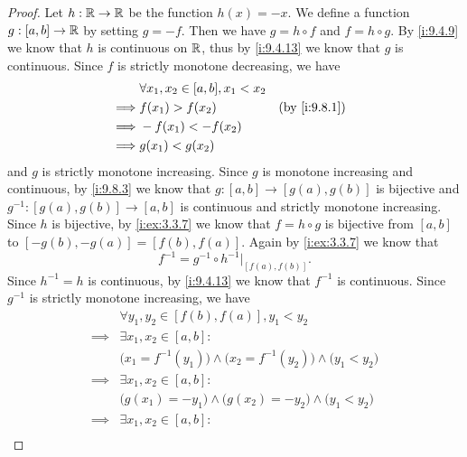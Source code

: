 \begin{proof}
  Let \(h : \mathbb{R} \to \mathbb{R}\) be the function \(h(x) = -x\).
  We define a function \(g : [a, b] \to \mathbb{R}\) by setting \(g = -f\).
  Then we have \(g = h \circ f\) and \(f = h \circ g\).
  By \cref{i:9.4.9} we know that \(h\) is continuous on \(\mathbb{R}\), thus by \cref{i:9.4.13} we know that \(g\) is continuous.
  Since \(f\) is strictly monotone decreasing, we have
  \begin{align*}
             & \forall x_1, x_2 \in [a, b], x_1 < x_2                   \\
    \implies & f(x_1) > f(x_2)                        &  & \by{i:9.8.1} \\
    \implies & -f(x_1) < -f(x_2)                                        \\
    \implies & g(x_1) < g(x_2)
  \end{align*}
  and \(g\) is strictly monotone increasing.
  Since \(g\) is monotone increasing and continuous, by \cref{i:9.8.3} we know that \(g : [a, b] \to [g(a), g(b)]\) is bijective and \(g^{-1} : [g(a), g(b)] \to [a, b]\) is continuous and strictly monotone increasing.
  Since \(h\) is bijective, by \cref{i:ex:3.3.7} we know that \(f = h \circ g\) is bijective from \([a, b]\) to \([-g(b), -g(a)] = [f(b), f(a)]\).
  Again by \cref{i:ex:3.3.7} we know that
  \[
    f^{-1} = g^{-1} \circ h^{-1}|_{[f(a), f(b)]}.
  \]
  Since \(h^{-1} = h\) is continuous, by \cref{i:9.4.13} we know that \(f^{-1}\) is continuous.
  Since \(g^{-1}\) is strictly monotone increasing, we have
  \begin{align*}
             & \forall y_1, y_2 \in [f(b), f(a)], y_1 < y_2                                                              \\
    \implies & \exists x_1, x_2 \in [a, b] :                                                                             \\
             & \big(x_1 = f^{-1}(y_1)\big) \land \big(x_2 = f^{-1}(y_2)\big) \land \big(y_1 < y_2\big)                   \\
    \implies & \exists x_1, x_2 \in [a, b] :                                                                             \\
             & \big(g(x_1) = -y_1\big) \land \big(g(x_2) = -y_2\big) \land \big(y_1 < y_2\big)                           \\
    \implies & \exists x_1, x_2 \in [a, b] :                                                                             \\

\end{align*}
\end{proof}

